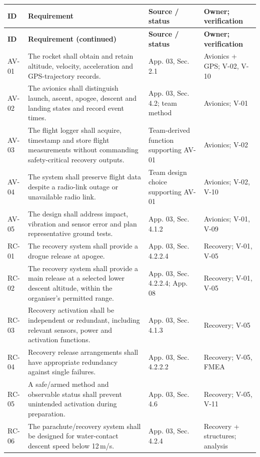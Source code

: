 \footnotesize
{}
\begin{longtable}{@{}L{12mm}L{71mm}L{33mm}L{34mm}@{}}
\toprule{}\textbf{ID}&\textbf{Requirement}&\textbf{Source / status}&\textbf{Owner; verification}\\\midrule\endfirsthead
\toprule{}\textbf{ID}&\textbf{Requirement (continued)}&\textbf{Source / status}&\textbf{Owner; verification}\\\midrule\endhead
\bottomrule\endlastfoot
AV-01 & The rocket shall obtain and retain altitude, velocity, acceleration and GPS-trajectory records. & App. 03, Sec. 2.1 \cite{rtc2027app03} & Avionics + GPS; V-02, V-10\\
AV-02 & The avionics shall distinguish launch, ascent, apogee, descent and landing states and record event times. & App. 03, Sec. 4.2; team method & Avionics; V-01\\
AV-03 & The flight logger shall acquire, timestamp and store flight measurements without commanding safety-critical recovery outputs. & Team-derived function supporting AV-01 & Avionics; V-02\\
AV-04 & The system shall preserve flight data despite a radio-link outage or unavailable radio link. & Team design choice supporting AV-01 & Avionics; V-02, V-10\\
AV-05 & The design shall address impact, vibration and sensor error and plan representative ground tests. & App. 03, Sec. 4.1.2 \cite{rtc2027app03} & Avionics; V-01, V-09\\
RC-01 & The recovery system shall provide a drogue release at apogee. & App. 03, Sec. 4.2.2.4 & Recovery; V-01, V-05\\
RC-02 & The recovery system shall provide a main release at a selected lower descent altitude, within the organiser's permitted range. & App. 03, Sec. 4.2.2.4; App. 08 & Recovery; V-01, V-05\\
RC-03 & Recovery activation shall be independent or redundant, including relevant sensors, power and activation functions. & App. 03, Sec. 4.1.3 & Recovery; V-05\\
RC-04 & Recovery release arrangements shall have appropriate redundancy against single failures. & App. 03, Sec. 4.2.2.2 & Recovery; V-05, FMEA\\
RC-05 & A safe/armed method and observable status shall prevent unintended activation during preparation. & App. 03, Sec. 4.6 & Recovery; V-05, V-11\\
RC-06 & The parachute/recovery system shall be designed for water-contact descent speed below 12\,m/s. & App. 03, Sec. 4.2.4 & Recovery + structures; analysis\\

\end{longtable}

